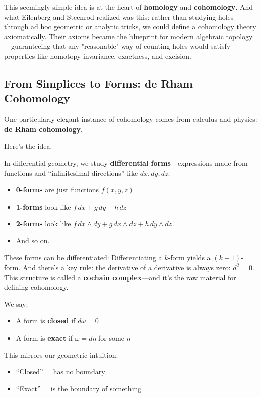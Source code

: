 This seemingly simple idea is at the heart of \textbf{homology} and \textbf{cohomology}. And what Eilenberg and Steenrod realized was this: rather than studying holes through ad hoc geometric or analytic tricks, we could define a cohomology theory axiomatically. Their axioms became the blueprint for modern algebraic topology—guaranteeing that any "reasonable" way of counting holes would satisfy properties like homotopy invariance, exactness, and excision.

\subsection{From Simplices to Forms: de Rham Cohomology}

One particularly elegant instance of cohomology comes from calculus and physics: \textbf{de Rham cohomology}.

Here’s the idea.

In differential geometry, we study \textbf{differential forms}—expressions made from functions and “infinitesimal directions” like \( dx, dy, dz \):

\begin{itemize}
    \item \textbf{0-forms} are just functions \( f(x, y, z) \)
    \item \textbf{1-forms} look like \( f\,dx + g\,dy + h\,dz \)
    \item \textbf{2-forms} look like \( f\,dx \wedge dy + g\,dx \wedge dz + h\,dy \wedge dz \)
    \item And so on.
\end{itemize}

These forms can be differentiated:  
Differentiating a \( k \)-form yields a \( (k+1) \)-form. And there’s a key rule: the derivative of a derivative is always zero: \( d^2 = 0 \). This structure is called a \textbf{cochain complex}—and it’s the raw material for defining cohomology.

We say:
\begin{itemize}
    \item A form is \textbf{closed} if \( d\omega = 0 \)
    \item A form is \textbf{exact} if \( \omega = d\eta \) for some \(\eta\)
\end{itemize}

This mirrors our geometric intuition:
\begin{itemize}
    \item “Closed” = has no boundary
    \item “Exact” = is the boundary of something
\end{itemize}

